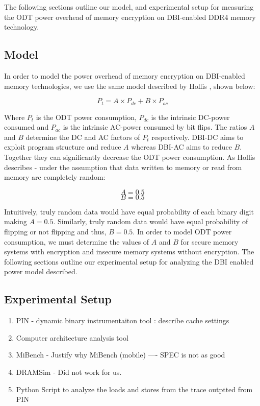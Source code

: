 The following sections outline our model, and experimental setup for measuring
the ODT power overhead of memory encryption on DBI-enabled DDR4 memory
technology.

\subsection{Model}
In order to model the power overhead of memory encryption on DBI-enabled memory
technologies, we use the same model described by Hollis \cite{hollis}, shown
below:

    $$ P_t = A \times P_{dc} + B \times P_{ac}$$

Where $P_t$ is the ODT power consumption, $P_{dc}$ is the intrinsic DC-power
consumed and $P_{ac}$ is the intrinsic AC-power consumed by bit flips. The
ratios $A$ and $B$ determine the DC and AC factors of $P_t$ respectively.
DBI-DC aims to exploit program structure and reduce $A$ whereas DBI-AC aims to
reduce $B$. Together they can significantly decrease the ODT power consumption.
As Hollis \cite{hollis} describes - under the assumption that data written to
memory or read from memory are completely random:

  $$ A = 0.5$$
  $$ B = 0.5$$

Intuitively, truly random data would have equal probability of each binary
digit making $A = 0.5$. Similarly, truly random data would have equal
probability of flipping or not flipping and thus, $B = 0.5$. In order to model
ODT power consumption, we must determine the values of $A$ and $B$ for secure
memory systems with encryption and insecure memory systems without encryption.
The following sections outline our experimental setup for analyzing the DBI
enabled power model described.

\subsection{Experimental Setup}
\begin{enumerate}
  \item PIN - dynamic binary instrumentaiton tool : describe cache settings
  \item Computer architecture analysis tool
  \item MiBench - Justify why MiBench (mobile) ---- SPEC is not as good
  \item DRAMSim - Did not work for us.
  \item Python Script to analyze the loads and stores from the trace outptted
    from PIN
\end{enumerate}
